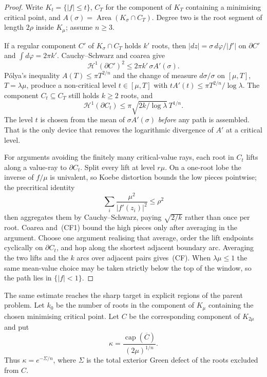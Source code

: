 \begin{proof}
Write $K_t=\{|f|\le t\}$, $C_T$ for the component of $K_T$ containing a
minimising critical point, and $A(\sigma)=\operatorname{Area}(K_\sigma\cap C_T)$.
Degree two is the root segment of length $2\rho$ inside $K_\mu$; assume
$n\ge3$.

If a regular component $C'$ of $K_\sigma\cap C_T$ holds $k'$ roots, then
$|dz|=\sigma\,d\varphi/|f'|$ on $\partial C'$ and $\int d\varphi=2\pi k'$.
Cauchy--Schwarz and coarea give
\[
 \mathcal H^1(\partial C')^2
 \le2\pi k'\,\sigma A'(\sigma).                     \tag{CF1}
\]
P\'olya's inequality $A(T)\le\pi T^{2/n}$ and the change of measure
$d\sigma/\sigma$ on $[\mu,T]$, $T=\lambda\mu$, produce a non-critical level
$t\in[\mu,T]$ with $t A'(t)\le\pi T^{2/n}/\log\lambda$.  The component
$C_t\subseteq C_T$ still holds $k\ge2$ roots, and
\[
 \mathcal H^1(\partial C_t)
 \le\pi\sqrt{2k/\log\lambda}\,T^{1/n}.
\]
The level $t$ is chosen from the mean of $\sigma A'(\sigma)$ \emph{before}
any path is assembled.  That is the only device that removes the logarithmic
divergence of $A'$ at a critical level.

For arguments avoiding the finitely many critical-value rays, each root in
$C_t$ lifts along a value-ray to $\partial C_t$.  Split every lift at level
$r\mu$.  On a one-root lobe the inverse of $f/\mu$ is univalent, so Koebe
distortion bounds the low pieces pointwise; the precritical identity
\[
 \sum_i\frac{\mu^2}{|f'(z_i)|^2}\le\rho^2          \tag{CF2}
\]
then aggregates them by Cauchy--Schwarz, paying $\sqrt{2/k}$ rather than
once per root.  Coarea and~(CF1) bound the high pieces only after averaging
in the argument.  Choose one argument realising that average, order the lift
endpoints cyclically on $\partial C_t$, and hop along the shortest adjacent
boundary arc.  Averaging the two lifts and the $k$ arcs over adjacent pairs
gives~(CF).  When $\lambda\mu\le1$ the same mean-value choice may be taken
strictly below the top of the window, so the path lies in $\{|f|<1\}$.
\end{proof}

The same estimate reaches the sharp target in explicit regions of the parent
problem.  Let $k_0$ be the number of roots in the component of $K_\mu$
containing the chosen minimising critical point.  Let $C$ be the corresponding
component of $K_{2\mu}$ and put
\[
 \kappa=\frac{\operatorname{cap}(\overline C)}{(2\mu)^{1/n}}.
\]
Thus $\kappa=e^{-\Sigma/n}$, where $\Sigma$ is the total exterior Green
defect of the roots excluded from $C$.

